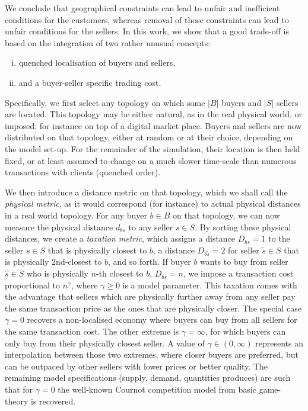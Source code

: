 \documentclass[a4paper,12pt]{article}
\begin{document}
We conclude that geographical constraints can lead to unfair and inefficient conditions for the customers, whereas removal of those constraints can lead to unfair conditions for the sellers. 
In this work, we show that a good trade-off is based on the integration of two rather unusual concepts:
\begin{enumerate}[(i),topsep=0pt,itemsep=-1ex,partopsep=1ex,parsep=1ex]
	
	\item quenched localisation of buyers and sellers, 
	
	\item and a buyer-seller specific trading cost.

\end{enumerate}

Specifically, we first select any topology on which some $|B|$ buyers and $|S|$ sellers are located. 
This topology may be either natural, as in the real physical world, or imposed, for instance on top of a digital market place.  
Buyers and sellers are now distributed on that topology, either at random or at their choice, depending on the model set-up. 
For the remainder of the simulation, their location is then held fixed, or at least assumed to change on a much slower time-scale than numerous transactions with clients (quenched order). 

We then introduce a distance metric on that topology, which we shall call the \textit{physical metric}, as it would correspond (for instance) to actual physical distances in a real world topology. 
For any buyer $b \in B$ on that topology, we can now measure the physical distance $d_{bs}$ to any seller $s \in S$. 
By sorting these physical distances, we create a \textit{taxation metric}, which assigns a distance $D_{bs}=1$ 
to the seller $s \in S$ that is physically closest to $b$, a distance $D_{b\tilde{s}}=2$ for seller $\tilde{s} \in S$ that is physically 2nd-closest to $b$, and so forth. 
If buyer $b$ wants to buy from seller $\hat{s} \in S$ who is physically $n$-th closest to $b$, $D_{b \hat{s}}=n$, 
we impose a transaction cost proportional to $n^\gamma$, where $\gamma \geqslant 0$ is a model parameter. 
This taxation comes with the advantage that sellers which are physically further away from any seller pay the same transaction price as the ones that are physically closer. 
The special case $\gamma = 0$ recovers a non-localised economy where buyers can buy from all sellers for the same transaction cost. 
The other extreme is $\gamma=\infty$, for which buyers can only buy from their physically closest seller. 
A value of $\gamma \in (0, \infty)$ represents an interpolation between those two extremes, where closer buyers are preferred, but can be outpaced by other sellers with lower prices or better quality. 
The remaining model specifications (supply, demand, quantities produces) are such that for $\gamma = 0$ the well-known Cournot competition model from basic game-theory is recovered. 
\end{document}
